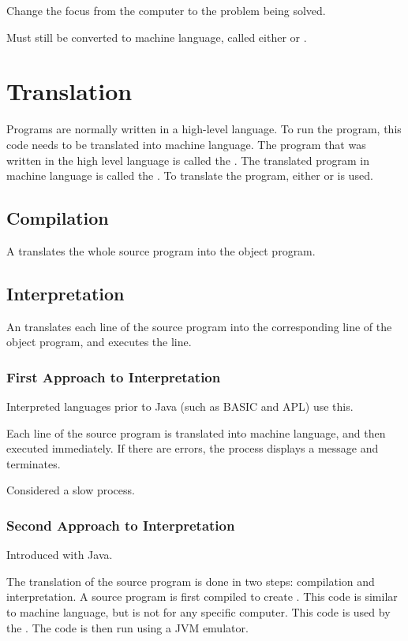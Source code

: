 \documentclass[\main/notes.tex]{subfiles}
\begin{document}
				Change the focus from the computer to the problem being solved.

				Must still be converted to machine language, called either  or .

		\section{Translation}
			Programs are normally written in a high-level language. To run the program, this code needs to be translated into machine language. The program that was written in the high level language is called the . The translated program in machine language is called the . To translate the program, either  or  is used.

			\subsection{Compilation}
				A  translates the whole source program into the object program.

			\subsection{Interpretation}
				An  translates each line of the source program into the corresponding line of the object program, and executes the line.

				\subsubsection{First Approach to Interpretation}
					Interpreted languages prior to Java (such as BASIC and APL) use this.

					Each line of the source program is translated into machine language, and then executed immediately. If there are errors, the process displays a message and terminates.

					Considered a slow process.
				\subsubsection{Second Approach to Interpretation}
					Introduced with Java.

					The translation of the source program is done in two steps: compilation and interpretation. A source program is first compiled to create . This code is similar to machine language, but is not for any specific computer. This code is used by the . The code is then run using a JVM emulator.
			\pagebreak
\end{document}
